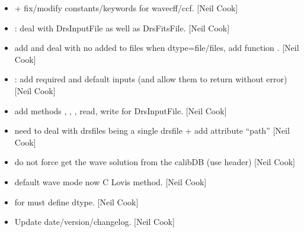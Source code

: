 \documentclass[a4paper,10pt,english]{report}
\begin{document}
\begin{itemize}
\item {} 
 +  \sphinxhyphen{}
fix/modify constants/keywords for wavecff/ccf. {[}Neil Cook{]}

\item {} 
 \sphinxhyphen{} : deal with DrsInputFile as
well as DrsFitsFile. {[}Neil Cook{]}

\item {} 
 \sphinxhyphen{} add  and deal with no 
added to files when dtype=file/files, add function .
{[}Neil Cook{]}

\item {} 
 \sphinxhyphen{} : add required and default inputs
(and allow them to return without error) {[}Neil Cook{]}

\item {} 
 \sphinxhyphen{} add methods ,
, , read, write for
DrsInputFile. {[}Neil Cook{]}

\item {} 
 \sphinxhyphen{} need to deal with drsfiles being a single
drsfile + add attribute “path” {[}Neil Cook{]}

\item {} 
 \sphinxhyphen{} do not force get the
wave solution from the calibDB (use header) {[}Neil Cook{]}

\item {} 
 \sphinxhyphen{} default wave mode now C
Lovis method. {[}Neil Cook{]}

\item {} 
 \sphinxhyphen{} for  must define
dtype. {[}Neil Cook{]}

\item {} 
Update date/version/changelog. {[}Neil Cook{]}

\end{itemize}
\end{document}
